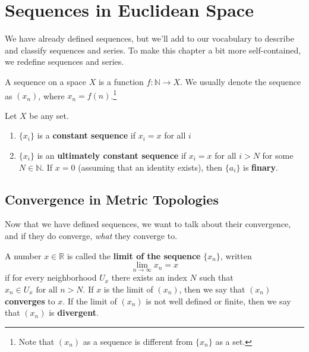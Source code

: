 \section{Sequences in Euclidean Space} 

  We have already defined sequences, but we'll add to our vocabulary to describe and classify sequences and series. To make this chapter a bit more self-contained, we redefine sequences and series. 

  \begin{definition}[Sequence]
    \label{def:sequence}
    A sequence on a space $X$ is a function $f: \mathbb{N} \rightarrow X$. We usually denote the sequence as $(x_n)$, where $x_n = f(n)$.\footnote{Note that $(x_n)$ as a sequence is different from $\{x_n\}$ as a set.} 
  \end{definition}

  \begin{definition}
    Let $X$ be any set. 
    \begin{enumerate}
      \item $\{x_i\}$ is a \textbf{constant sequence} if $x_i = x$ for all $i$
      \item $\{x_i\}$ is an \textbf{ultimately constant sequence} if $x_i = x$ for all $i > N$ for some $N \in \mathbb{N}$. If $x = 0$ (assuming that an identity exists), then $\{a_i\}$ is \textbf{finary}.
    \end{enumerate}
  \end{definition}

\subsection{Convergence in Metric Topologies}

  Now that we have defined sequences, we want to talk about their convergence, and if they do converge, \textit{what} they converge to. 

  \begin{definition}
    A number $x \in \mathbb{R}$ is called the \textbf{limit of the sequence} $\{x_n\}$, written 
    \begin{equation}
      \lim_{n \rightarrow \infty} x_n = x
    \end{equation}
    if for every neighborhood $U_x$ there exists an index $N$ such that $x_n \in U_x \text{ for all } n > N$. If $x$ is the limit of $(x_n)$, then we say that $(x_n)$ \textbf{converges} to $x$. If the limit of $(x_n)$ is not well defined or finite, then we say that $(x_n)$ is \textbf{divergent}. 
  \end{definition}

